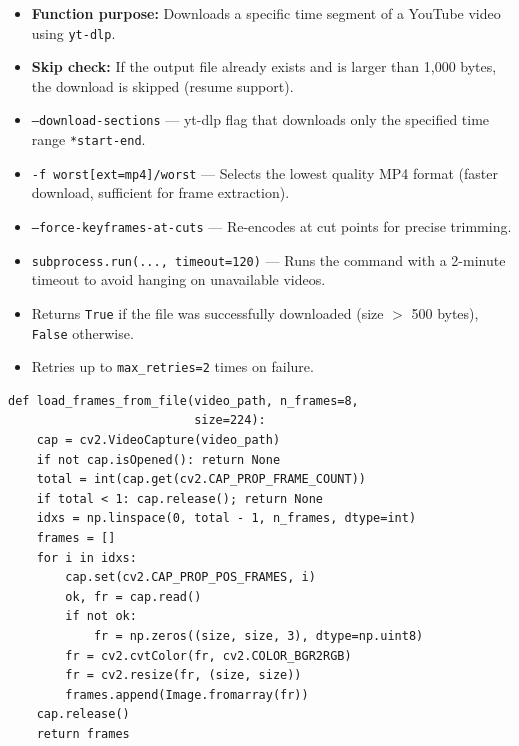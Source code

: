 \begin{explanation}
\begin{itemize}[nosep]
  \item \textbf{Function purpose:} Downloads a specific time segment of a YouTube video using \texttt{yt-dlp}.
  \item \textbf{Skip check:} If the output file already exists and is larger than 1,000 bytes, the download is skipped (resume support).
  \item \texttt{--download-sections} --- yt-dlp flag that downloads only the specified time range \texttt{*start-end}.
  \item \texttt{-f worst[ext=mp4]/worst} --- Selects the lowest quality MP4 format (faster download, sufficient for frame extraction).
  \item \texttt{--force-keyframes-at-cuts} --- Re-encodes at cut points for precise trimming.
  \item \texttt{subprocess.run(..., timeout=120)} --- Runs the command with a 2-minute timeout to avoid hanging on unavailable videos.
  \item Returns \texttt{True} if the file was successfully downloaded (size $>$ 500 bytes), \texttt{False} otherwise.
  \item Retries up to \texttt{max\_retries=2} times on failure.
\end{itemize}
\end{explanation}

\begin{lstlisting}
def load_frames_from_file(video_path, n_frames=8,
                          size=224):
    cap = cv2.VideoCapture(video_path)
    if not cap.isOpened(): return None
    total = int(cap.get(cv2.CAP_PROP_FRAME_COUNT))
    if total < 1: cap.release(); return None
    idxs = np.linspace(0, total - 1, n_frames, dtype=int)
    frames = []
    for i in idxs:
        cap.set(cv2.CAP_PROP_POS_FRAMES, i)
        ok, fr = cap.read()
        if not ok:
            fr = np.zeros((size, size, 3), dtype=np.uint8)
        fr = cv2.cvtColor(fr, cv2.COLOR_BGR2RGB)
        fr = cv2.resize(fr, (size, size))
        frames.append(Image.fromarray(fr))
    cap.release()
    return frames
\end{lstlisting}

